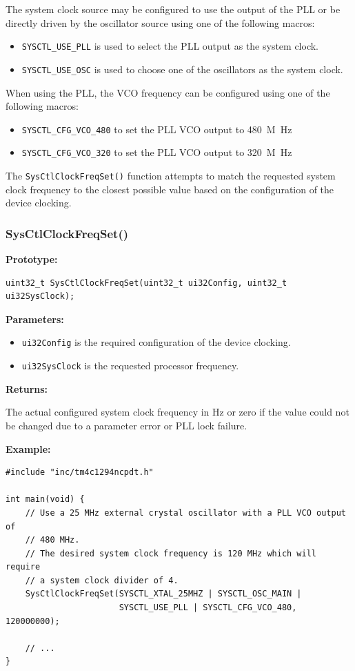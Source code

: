 \documentclass{article}
\begin{document}
The system clock source may be configured to use the output of the PLL
or be directly driven by the oscillator source using one of the
following macros:
\begin{itemize}
    \item \texttt{SYSCTL_USE_PLL} is used to select the PLL output as the system clock.
    \item \texttt{SYSCTL_USE_OSC} is used to choose one of the oscillators as the system clock.
\end{itemize}
When using the PLL, the VCO frequency can be configured using one of the
following macros:
\begin{itemize}
    \item \texttt{SYSCTL_CFG_VCO_480} to set the PLL VCO output to \qty{480}{M.Hz}
    \item \texttt{SYSCTL_CFG_VCO_320} to set the PLL VCO output to \qty{320}{M.Hz}
\end{itemize}
The \texttt{SysCtlClockFreqSet()} function attempts to match the
requested system clock frequency to the closest possible value based on
the configuration of the device clocking.
\subsubsection{SysCtlClockFreqSet()}
\textbf{Prototype:}
\begin{verbatim}
uint32_t SysCtlClockFreqSet(uint32_t ui32Config, uint32_t ui32SysClock);
\end{verbatim}
\textbf{Parameters:}
\begin{itemize}
    \item \texttt{ui32Config} is the required configuration of the device clocking.
    \item \texttt{ui32SysClock} is the requested processor frequency.
\end{itemize}
\textbf{Returns:}
\medskip

The actual configured system clock frequency in Hz or zero if the value
could not be changed due to a parameter error or PLL lock failure.

\medskip
\textbf{Example:}
\begin{verbatim}
#include "inc/tm4c1294ncpdt.h"

int main(void) {
    // Use a 25 MHz external crystal oscillator with a PLL VCO output of
    // 480 MHz.
    // The desired system clock frequency is 120 MHz which will require
    // a system clock divider of 4.
    SysCtlClockFreqSet(SYSCTL_XTAL_25MHZ | SYSCTL_OSC_MAIN |
                       SYSCTL_USE_PLL | SYSCTL_CFG_VCO_480, 120000000);

    // ...
}
\end{verbatim}
\end{document}
